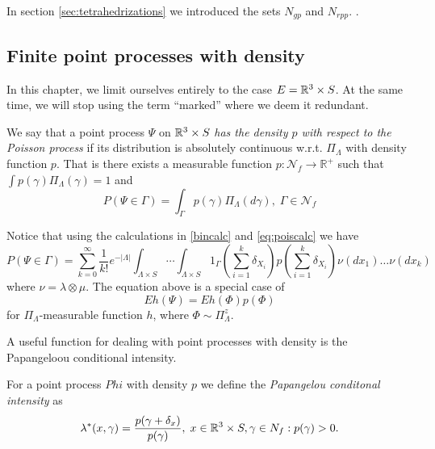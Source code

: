 \begin{remark}
	In section \ref{sec:tetrahedrizations} we introduced the sets $N_{gp}$ and $N_{rpp}$. \cite{Zessin2008}.
\end{remark}


\subsection{Finite point processes with density}
In this chapter, we limit ourselves entirely to the case $E={\mathbb R^3} \times S$. At the same time, we will stop using the term ``marked'' where we deem it redundant. 

\begin{definition}
	We say that a point process $\Psi$ on ${\mathbb R^3} \times S$ \textit{has the density $p$ with respect to the Poisson process} if its distribution is absolutely continuous w.r.t. $\Pi_\Lambda$ with density function $p$. That is there exists a measurable function $p:\mathcal N_f \to \mathbb R^+$ such that $\int p(\gamma) \Pi_\Lambda (\gamma)=1$ and
$$P(\Psi \in \Gamma) = \int_\Gamma p(\gamma) \Pi_\Lambda(d\gamma), \; \Gamma \in \mathcal N_{f}$$
\end{definition}

Notice that using the calculations in \ref{bincalc} and \ref{eq:poiscalc} we have
$$
P(\Psi \in \Gamma) = \sum^\infty_{k=0} \frac{1}{k!} e^{-|\Lambda|} \int_{\Lambda\times S} \cdots \int_{\Lambda\times S} 1_{\Gamma} \left(\sum^k_{i=1} \delta_{X_i}\right) p\left(\sum^k_{i=1} \delta_{X_i}\right) \nu(dx_1) \dots \nu(dx_k)
$$
where $\nu=\lambda\otimes \mu$.
	The equation above is a special case of 
$$Eh(\Psi)=Eh(\Phi)p(\Phi)$$
for $\Pi_\Lambda$-measurable function $h$, where $\Phi \sim \Pi^z_\Lambda$.

A useful function for dealing with point processes with density is the Papangeloou conditional intensity.
\begin{definition}
	For  a point process $Phi$ with density $p$ we define the \textit{Papangelou conditonal intensity} as 
	$$\lambda^*(x,\gamma) = \frac{p(\gamma + \delta_x)}{p(\gamma)}, \; x \in {\mathbb R^3} \times S, \gamma \in N_{f}: p(\gamma)>0.$$
\end{definition}

